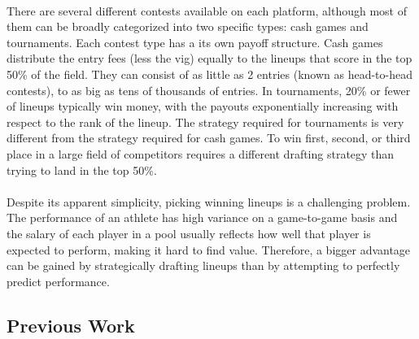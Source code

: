 \documentclass{article}
\begin{document}
\\
There are several different contests available on each platform, although most of them can be broadly categorized into two specific types: cash games and tournaments. Each contest type has a its own payoff structure. Cash games distribute the entry fees (less the vig) equally to the lineups that score in the top 50\% of the field. They can consist of as little as 2 entries (known as head-to-head contests), to as big as tens of thousands of entries. In tournaments, 20\% or fewer of lineups typically win money, with the payouts exponentially increasing with respect to the rank of the lineup. The strategy required for tournaments is very different from the strategy required for cash games. To win first, second, or third place in a large field of competitors requires a different drafting strategy than trying to land in the top 50\%.\\
\\
Despite its apparent simplicity, picking winning lineups is a challenging problem. The performance of an athlete has high variance on a game-to-game basis and the salary of each player in a pool usually reflects how well that player is expected to perform, making it hard to find value. Therefore, a bigger advantage can be gained by strategically drafting lineups than by attempting to perfectly predict performance.

\subsection{Previous Work}
\end{document}
